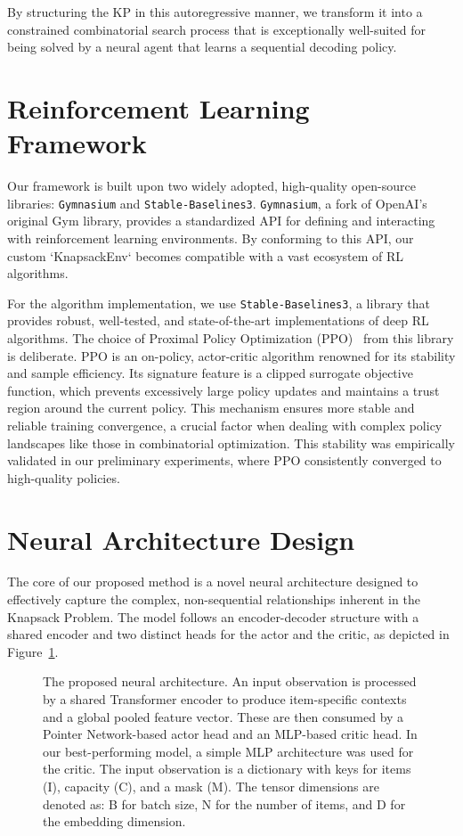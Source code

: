 By structuring the KP in this autoregressive manner, we transform it into a constrained combinatorial search process that is exceptionally well-suited for being solved by a neural agent that learns a sequential decoding policy.

\section{Reinforcement Learning Framework}
Our framework is built upon two widely adopted, high-quality open-source libraries: \texttt{Gymnasium} and \texttt{Stable-Baselines3}. \texttt{Gymnasium}, a fork of OpenAI's original Gym library, provides a standardized API for defining and interacting with reinforcement learning environments. By conforming to this API, our custom `KnapsackEnv` becomes compatible with a vast ecosystem of RL algorithms.

For the algorithm implementation, we use \texttt{Stable-Baselines3}, a library that provides robust, well-tested, and state-of-the-art implementations of deep RL algorithms. The choice of Proximal Policy Optimization (PPO)~\cite{schulmanProximalPolicyOptimization2017} from this library is deliberate. PPO is an on-policy, actor-critic algorithm renowned for its stability and sample efficiency. Its signature feature is a clipped surrogate objective function, which prevents excessively large policy updates and maintains a trust region around the current policy. This mechanism ensures more stable and reliable training convergence, a crucial factor when dealing with complex policy landscapes like those in combinatorial optimization. This stability was empirically validated in our preliminary experiments, where PPO consistently converged to high-quality policies.

\section{Neural Architecture Design}
The core of our proposed method is a novel neural architecture designed to effectively capture the complex, non-sequential relationships inherent in the Knapsack Problem. The model follows an encoder-decoder structure with a shared encoder and two distinct heads for the actor and the critic, as depicted in Figure~\ref{fig:model_architecture}.

\begin{figure}[H]
    \centering
    
    \caption{The proposed neural architecture. An input observation is processed by a shared Transformer encoder to produce item-specific contexts and a global pooled feature vector. These are then consumed by a Pointer Network-based actor head and an MLP-based critic head. In our best-performing model, a simple MLP architecture was used for the critic. The input observation is a dictionary with keys for items (I), capacity (C), and a mask (M). The tensor dimensions are denoted as: B for batch size, N for the number of items, and D for the embedding dimension.}
    \label{fig:model_architecture}
\end{figure}

